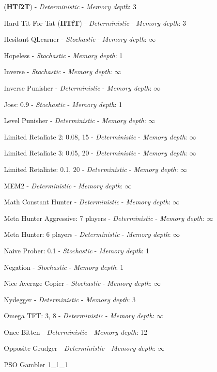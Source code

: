 (\textbf{HTf2T}) - \textit{Deterministic} - \textit{Memory depth}: 3\item Hard Tit For Tat
(\textbf{HTfT}) - \textit{Deterministic} - \textit{Memory depth}: 3\item Hesitant QLearner
 - \textit{Stochastic} - \textit{Memory depth}: \(\infty\)\item Hopeless
 - \textit{Stochastic} - \textit{Memory depth}: 1\item Inverse
 - \textit{Stochastic} - \textit{Memory depth}: \(\infty\)\item Inverse Punisher
 - \textit{Deterministic} - \textit{Memory depth}: \(\infty\)\item Joss: 0.9
 - \textit{Stochastic} - \textit{Memory depth}: 1\item Level Punisher
 - \textit{Deterministic} - \textit{Memory depth}: \(\infty\)\item Limited Retaliate 2: 0.08, 15
 - \textit{Deterministic} - \textit{Memory depth}: \(\infty\)\item Limited Retaliate 3: 0.05, 20
 - \textit{Deterministic} - \textit{Memory depth}: \(\infty\)\item Limited Retaliate: 0.1, 20
 - \textit{Deterministic} - \textit{Memory depth}: \(\infty\)\item MEM2
 - \textit{Deterministic} - \textit{Memory depth}: \(\infty\)\item Math Constant Hunter
 - \textit{Deterministic} - \textit{Memory depth}: \(\infty\)\item Meta Hunter Aggressive: 7 players
 - \textit{Deterministic} - \textit{Memory depth}: \(\infty\)\item Meta Hunter: 6 players
 - \textit{Deterministic} - \textit{Memory depth}: \(\infty\)\item Naive Prober: 0.1
 - \textit{Stochastic} - \textit{Memory depth}: 1\item Negation
 - \textit{Stochastic} - \textit{Memory depth}: 1\item Nice Average Copier
 - \textit{Stochastic} - \textit{Memory depth}: \(\infty\)\item Nydegger
 - \textit{Deterministic} - \textit{Memory depth}: 3\item Omega TFT: 3, 8
 - \textit{Deterministic} - \textit{Memory depth}: \(\infty\)\item Once Bitten
 - \textit{Deterministic} - \textit{Memory depth}: 12\item Opposite Grudger
 - \textit{Deterministic} - \textit{Memory depth}: \(\infty\)\item PSO Gambler 1\_1\_1
